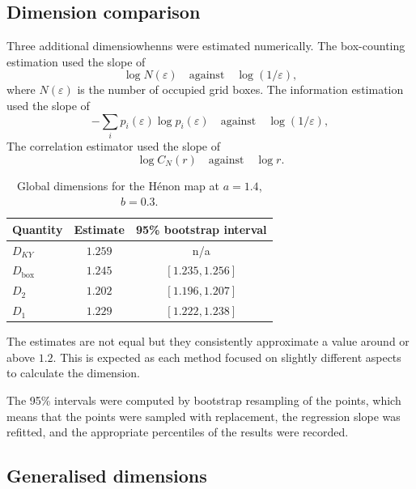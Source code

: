\documentclass[11pt,a4paper]{article}
\newcommand{\eps}{\varepsilon}
\begin{document}
\subsection{Dimension comparison}

Three additional dimensiowhenns were estimated numerically. The box-counting estimation used the slope of
\[
	\log N(\eps) \quad \text{against} \quad \log(1/\eps),
\]
where \(N(\eps)\) is the number of occupied grid boxes. The information estimation used the slope of
\[
	-\sum_i p_i(\eps)\log p_i(\eps) \quad \text{against} \quad \log(1/\eps),
\]
The correlation estimator used the slope of
\[
	\log C_N(r) \quad \text{against} \quad \log r.
\]

\begin{table}[H]
	\centering
	\begin{tabular}{lcc}
		\toprule
		Quantity           & Estimate & 95\% bootstrap interval \\
		\midrule
		$D_{KY}$           & $1.259$  & n/a                     \\
		$D_{\mathrm{box}}$ & $1.245$  & $[1.235,1.256]$         \\
		$D_2$              & $1.202$  & $[1.196,1.207]$         \\
		$D_1$              & $1.229$  & $[1.222,1.238]$         \\
		\bottomrule
	\end{tabular}
	\caption{Global dimensions for the H\'enon map at $a=1.4$, $b=0.3$.}
	\label{tab:global-dimensions}
\end{table}

The estimates are not equal but they consistently approximate a value around or above \(1.2\). This is expected as each method focused on slightly different aspects to calculate the dimension.

The 95\% intervals were computed by bootstrap resampling of the points, which means that the points were sampled with replacement, the regression slope was refitted, and the appropriate percentiles of the results were recorded.



\subsection{Generalised dimensions}
\end{document}
